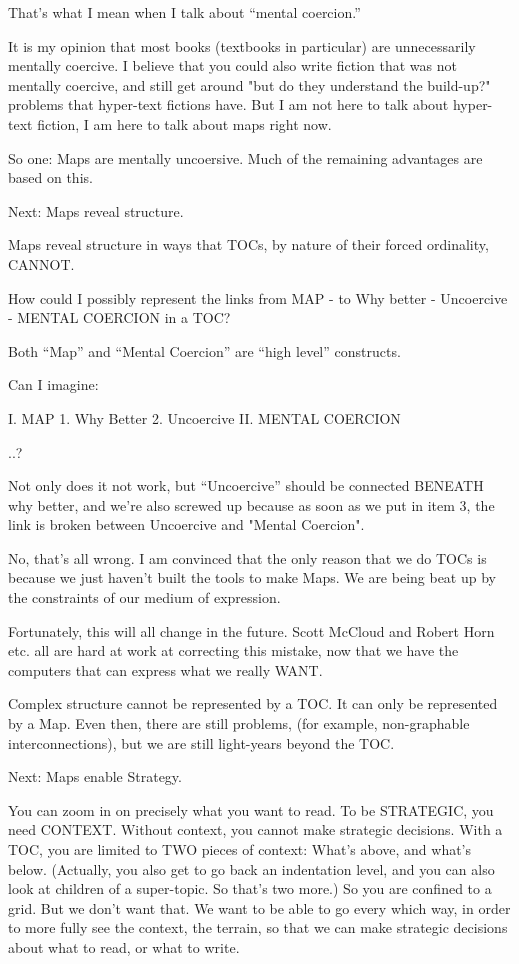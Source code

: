 \documentclass[oneside]{book}
\begin{document}
That's what I mean when I talk about ``mental coercion.''

It is my opinion that most books (textbooks in particular) are
unnecessarily mentally coercive. I believe that you could also write
fiction that was not mentally coercive, and still get around "but do
they understand the build-up?" problems that hyper-text fictions
have. But I am not here to talk about hyper-text fiction, I am here to
talk about maps right now.

So one: Maps are mentally uncoersive. Much of the remaining advantages
are based on this.

Next: Maps reveal structure.

Maps reveal structure in ways that TOCs, by nature of their forced
ordinality, CANNOT.

How could I possibly represent the links from MAP - to Why better -
Uncoercive - MENTAL COERCION in a TOC?

Both ``Map'' and ``Mental Coercion'' are ``high level'' constructs.

Can I imagine:

I. MAP
   1. Why Better
   2. Uncoercive
II. MENTAL COERCION

..?

Not only does it not work, but ``Uncoercive'' should be connected
BENEATH why better, and we're also screwed up because as soon as we
put in item 3, the link is broken between Uncoercive and "Mental
Coercion".

No, that's all wrong. I am convinced that the only reason that we do
TOCs is because we just haven't built the tools to make Maps. We are
being beat up by the constraints of our medium of expression.

Fortunately, this will all change in the future. Scott McCloud and
Robert Horn etc. all are hard at work at correcting this mistake, now
that we have the computers that can express what we really WANT.

Complex structure cannot be represented by a TOC. It can only be
represented by a Map. Even then, there are still problems, (for
example, non-graphable interconnections), but we are still light-years
beyond the TOC.

Next: Maps enable Strategy.

You can zoom in on precisely what you want to read.
To be STRATEGIC, you need CONTEXT. Without context, you cannot make
strategic decisions. With a TOC, you are limited to TWO pieces of
context: What's above, and what's below. (Actually, you also get to go
back an indentation level, and you can also look at children of a
super-topic. So that's two more.) So you are confined to a grid. But
we don't want that. We want to be able to go every which way, in order
to more fully see the context, the terrain, so that we can make
strategic decisions about what to read, or what to write.
\end{document}
